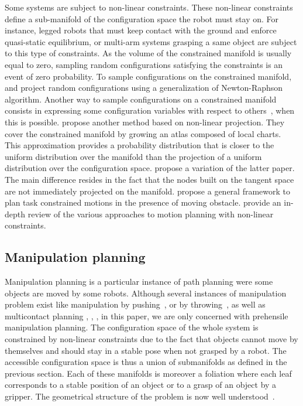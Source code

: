Some systems are subject to non-linear constraints. These non-linear
constraints define a sub-manifold of the configuration space the robot must
stay on. For instance, legged robots that must keep contact with the
ground and enforce quasi-static equilibrium, or multi-arm systems
grasping a same object are subject to this type of constraints. As the
volume of the constrained manifold is usually equal to zero, sampling
random configurations satisfying the constraints is an event of zero
probability. To sample configurations on the constrained manifold,
\cite{DalNakLamLau2009} and \cite{berenson2011} project random
configurations using a generalization of Newton-Raphson
algorithm. Another way to sample configurations on a constrained
manifold consists in expressing some configuration variables with
respect to others~\cite{Cortes2002}, \cite{MirLam2018} when this is
possible. \cite{atlasRRT} propose another method based on non-linear
projection. They cover the constrained manifold by growing an atlas
composed of local charts. This approximation provides a probability
distribution that is closer to the uniform distribution over the
manifold than the projection of a uniform distribution over the
configuration space. \cite{tb-rrt2016} propose a variation of the latter paper.
The main difference resides in the fact that the nodes
built on the tangent space are not immediately projected on the manifold.
\cite{CefOri2019} propose a general framework to plan task constrained motions
in the presence of moving obstacle.
\cite{KinMolKav2019} provide an in-depth review of the various approaches to
motion planning with non-linear constraints.

\subsection{Manipulation planning}

Manipulation planning is a particular instance of path planning were
some objects are moved by some robots.
Although several instances of
manipulation problem exist like manipulation by
pushing~\cite{BenRiv1998}, or by throwing~\cite{WooZacLyn2017}, as well as
multicontact planning \cite{Bretl2006}, \cite{LenVaiYosKhe2013},
\cite{TonDelPetParManMan2018}, in this paper, we are only concerned with
prehensile manipulation planning.
The configuration space of the whole system is constrained by
non-linear constraints due to the fact that objects cannot move by
themselves and should stay in a stable pose when not grasped by a
robot.  The accessible configuration space is thus a union of
submanifolds as defined in the previous section. Each of these
manifolds is moreover a foliation where each leaf corresponds to a
stable position of an object or to a grasp of an object by a
gripper. The geometrical structure of the problem is now well
understood~\cite{AlaSimLau89}.

